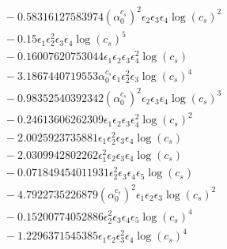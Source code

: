 \documentclass[10pt]{article}
\begin{document}
\begin{align*}
&{}  - 0.58316127583974 \left(\alpha_{0}^{c_s}\right)^{2} \epsilon_{2} \epsilon_{3} \epsilon_{4} \log{\left(c_{s} \right)}^{2} \\
&{}  - 0.15 \epsilon_{1} \epsilon_{2}^{2} \epsilon_{3} \epsilon_{4} \log{\left(c_{s} \right)}^{5} \\
&{}  - 0.16007620753044 \epsilon_{1} \epsilon_{2} \epsilon_{3} \epsilon_{4}^{2} \log{\left(c_{s} \right)} \\
&{}  - 3.1867440719553 \alpha_{0}^{c_s} \epsilon_{1} \epsilon_{2}^{2} \epsilon_{3} \log{\left(c_{s} \right)}^{4} \\
&{}  - 0.98352540392342 \left(\alpha_{0}^{c_s}\right)^{2} \epsilon_{2} \epsilon_{3} \epsilon_{4} \log{\left(c_{s} \right)}^{3} \\
&{}  - 0.24613606262309 \epsilon_{1} \epsilon_{2} \epsilon_{3} \epsilon_{4}^{2} \log{\left(c_{s} \right)}^{2} \\
&{}  - 2.0025923735881 \epsilon_{1} \epsilon_{2}^{2} \epsilon_{3} \epsilon_{4} \log{\left(c_{s} \right)} \\
&{}  - 2.0309942802262 \epsilon_{1}^{2} \epsilon_{2} \epsilon_{3} \epsilon_{4} \log{\left(c_{s} \right)} \\
&{}  - 0.071849454011931 \epsilon_{2}^{2} \epsilon_{3} \epsilon_{4} \epsilon_{5} \log{\left(c_{s} \right)} \\
&{}  - 4.7922735226879 \left(\alpha_{0}^{c_s}\right)^{2} \epsilon_{1} \epsilon_{2} \epsilon_{3} \log{\left(c_{s} \right)}^{2} \\
&{}  - 0.15200774052886 \epsilon_{2}^{2} \epsilon_{3} \epsilon_{4} \epsilon_{5} \log{\left(c_{s} \right)}^{4} \\
&{}  - 1.2296371545385 \epsilon_{1} \epsilon_{2} \epsilon_{3}^{2} \epsilon_{4} \log{\left(c_{s} \right)}^{4}
\end{align*}
\end{document}
